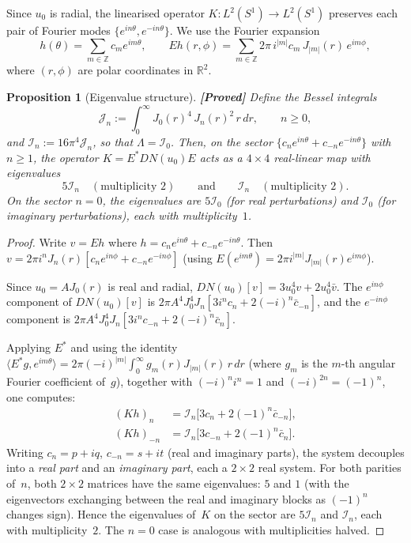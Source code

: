 \documentclass[12pt]{article}
\newtheorem{proposition}[theorem]{Proposition}
\theoremstyle{definition}
\theoremstyle{remark}
\newcommand{\R}{\mathbb{R}}
\newcommand{\Z}{\mathbb{Z}}
\newcommand{\proven}{\textbf{\color{teal}[Proved]}}
\begin{document}
Since $u_0$ is radial, the linearised operator
$K:L^2(S^1)\to L^2(S^1)$ preserves each pair of Fourier modes
$\{e^{in\theta},e^{-in\theta}\}$.  We use the Fourier expansion
\[
  h(\theta)=\sum_{m\in\Z}c_m e^{im\theta},
  \qquad
  Eh(r,\phi)=\sum_{m\in\Z} 2\pi\,i^{|m|}c_m\,J_{|m|}(r)\,e^{im\phi},
\]
where $(r,\phi)$ are polar coordinates in $\R^2$.

\begin{proposition}[Eigenvalue structure]
  \label{prop:eigenvalues}
  \proven\quad
  Define the Bessel integrals
  \begin{equation}  \label{eq:Jn-def}
    \mathcal J_n := \int_0^\infty J_0(r)^4\,J_n(r)^2\,r\,dr,
    \qquad n\geq 0,
  \end{equation}
  and $\mathcal I_n:=16\pi^4\mathcal J_n$, so that $\Lambda=\mathcal I_0$.
  Then, on the sector $\{c_ne^{in\theta}+c_{-n}e^{-in\theta}\}$ with
  $n\geq 1$, the operator $K=E^*DN(u_0)E$ acts as a $4\times 4$
  real-linear map with eigenvalues
  \[
    5\mathcal I_n\quad(\text{multiplicity }2)
    \qquad\text{and}\qquad
    \mathcal I_n\quad(\text{multiplicity }2).
  \]
  On the sector $n=0$, the eigenvalues are $5\mathcal I_0$ (for real
  perturbations) and $\mathcal I_0$ (for imaginary perturbations), each
  with multiplicity~$1$.
\end{proposition}

\begin{proof}
  Write $v=Eh$ where $h=c_ne^{in\theta}+c_{-n}e^{-in\theta}$.  Then
  $v=2\pi i^n J_n(r)[c_ne^{in\phi}+c_{-n}e^{-in\phi}]$
  (using $E(e^{im\theta})=2\pi i^{|m|}J_{|m|}(r)e^{im\phi}$).

  Since $u_0=AJ_0(r)$ is real and radial,
  $DN(u_0)[v]=3u_0^4 v+2u_0^4\bar v$. The $e^{in\phi}$ component of
  $DN(u_0)[v]$ is $2\pi A^4J_0^4J_n[3i^nc_n+2(-i)^n\bar c_{-n}]$,
  and the $e^{-in\phi}$ component is
  $2\pi A^4J_0^4J_n[3i^nc_{-n}+2(-i)^n\bar c_n]$.

  Applying $E^*$ and using the identity
  $\langle E^*g,e^{im\theta}\rangle=2\pi(-i)^{|m|}\int_0^\infty
  g_m(r)J_{|m|}(r)\,r\,dr$
  (where $g_m$ is the $m$-th angular Fourier coefficient of~$g$),
  together with $(-i)^ni^n=1$ and $(-i)^{2n}=(-1)^n$, one computes:
  \begin{align}
    (Kh)_n &= \mathcal I_n\bigl[3c_n+2(-1)^n\bar c_{-n}\bigr],
    \label{eq:Kn}\\
    (Kh)_{-n} &= \mathcal I_n\bigl[3c_{-n}+2(-1)^n\bar c_n\bigr].
    \label{eq:K-n}
  \end{align}
  Writing $c_n=p+iq$, $c_{-n}=s+it$ (real and imaginary parts), the system
  decouples into a \emph{real part} and an \emph{imaginary part}, each a
  $2\times 2$ real system.  For both parities of~$n$, both $2\times 2$
  matrices have the same eigenvalues: $5$ and $1$ (with the eigenvectors
  exchanging between the real and imaginary blocks as $(-1)^n$ changes sign).
  Hence the eigenvalues of~$K$ on the sector are $5\mathcal I_n$ and
  $\mathcal I_n$, each with multiplicity~$2$.
  The $n=0$ case is analogous with multiplicities halved.
\end{proof}
\end{document}
